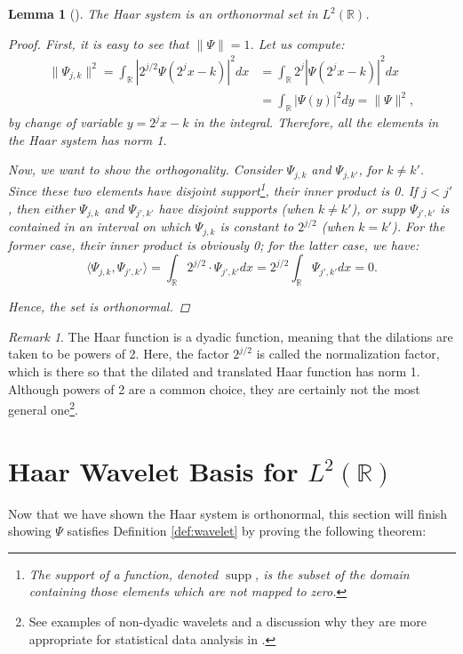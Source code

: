 \documentclass[11pt]{amsart}
\theoremstyle{theorem} %
\newtheorem{lem}[thm]{Lemma} %
\theoremstyle{definition}
\theoremstyle{example}
\theoremstyle{remark}
\newtheorem{rem}[thm]{Remark}
\numberwithin{equation}{section}
\newcommand{\R}{\mathbb{R}}
\DeclareMathOperator*{\supp}{supp}
\begin{document}
\begin{lem}[{\cite[409]{davidson}}] \label{lem:orthonormal}
	The Haar system is an orthonormal set in $ L^2(\R) $.
	
	\begin{proof}
		First, it is easy to see that $ \| \varPsi \| = 1 $. Let us compute:
		\begin{align*}
		\| \varPsi_{j,k} \|^2 = \int_{\R} \left| 2^{j/2} \varPsi(2^{j} x - k) \right|^2 dx 
		&=   \int_{\R} 2^j \left| \varPsi(2^{j} x - k) \right|^2 dx \\
		&= \int_{\R} \left| \varPsi(y) \right|^2 dy
		= \| \varPsi \|^2,
		\end{align*}
		by change of variable $ y = 2^{j}x-k $ in the integral. Therefore, all the elements in the Haar system has norm 1.
		
		Now, we want to show the orthogonality. Consider $ \varPsi_{j,k} $ and $ \varPsi_{j,k'} $, for $ k \neq k' $. Since these two elements have disjoint support\footnote{The \emph{support} of a function, denoted $ \supp $, is the subset of the domain containing those elements which are not mapped to zero.}, their inner product is 0. If $ j < j' $, then either $ \varPsi_{j,k} $ and $ \varPsi_{j',k'} $ have disjoint supports (when $ k \neq k' $), or supp $ \varPsi_{j',k'} $ is contained in an interval on which $ \varPsi_{j,k} $ is constant to $ 2^{j/2} $ (when $ k = k' $). For the former case, their inner product is obviously 0; for the latter case, we have:
		\[ \langle \varPsi_{j,k}, \varPsi_{j',k'} \rangle =  \int_{\R} 2^{j/2} \cdot \varPsi_{j',k'} dx = 2^{j/2} \int_{\R} \varPsi_{j',k'} dx = 0. \]
	
		Hence, the set is orthonormal.
	\end{proof}
\end{lem}

\begin{rem}
	The Haar function is a dyadic function, meaning that the dilations are taken to be powers of 2. Here, the factor $ 2^{j/2} $ is called the normalization factor, which is there so that the dilated and translated Haar function has norm 1. Although powers of 2 are a common choice, they are certainly not the most general one\footnote{See examples of non-dyadic wavelets and a discussion why they are more appropriate for statistical data analysis in \cite{pollock}.}.
\end{rem}

\section{Haar Wavelet Basis for $ L^2(\R) $} \label{section:span}
Now that we have shown the Haar system is orthonormal, this section will finish showing $ \varPsi $ satisfies Definition \ref{def:wavelet} by proving the following theorem:
\end{document}
